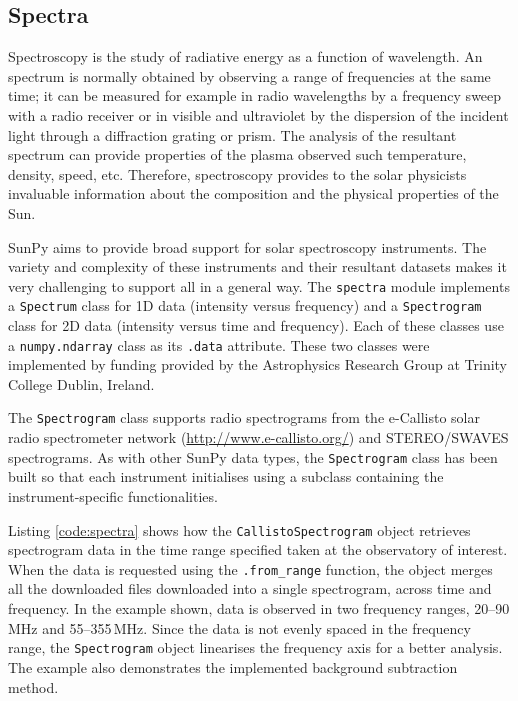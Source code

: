 \subsection{Spectra}\label{sec:spectra}

Spectroscopy is the study of radiative energy as a function of wavelength.
An spectrum is normally obtained by observing a range of frequencies at the same time; 
it can be measured for example in radio wavelengths by a frequency sweep with 
a radio receiver or in visible and ultraviolet by the dispersion of the incident light 
through a diffraction grating or prism.
The analysis of the resultant spectrum can provide properties of the plasma observed 
such temperature, density, speed, etc.
Therefore, spectroscopy provides to the solar physicists invaluable information about 
the composition and the physical properties of the Sun.  

SunPy aims to provide broad support for solar spectroscopy
instruments.  The variety and complexity of these instruments and
their resultant datasets makes it very challenging to support all in a
general way.  The \texttt{spectra} module implements a
\texttt{Spectrum} class for 1D data (intensity versus frequency) and a
\texttt{Spectrogram} class for 2D data (intensity versus time and
frequency).  Each of these classes use a \texttt{numpy.ndarray} class
as its \texttt{.data} attribute.  These two classes were implemented
by funding provided by the Astrophysics Research Group at Trinity
College Dublin, Ireland.

The \texttt{Spectrogram} class supports radio spectrograms from the e-Callisto 
solar radio spectrometer network (\url{http://www.e-callisto.org/})
and STEREO/SWAVES spectrograms.
As with other SunPy data types, the \texttt{Spectrogram} class has been
built so that each instrument initialises using a subclass containing the instrument-specific 
functionalities.

Listing \ref{code:spectra} shows how the \texttt{CallistoSpectrogram}
object retrieves spectrogram data in the time range specified taken at
the observatory of interest.  When the data is requested using the
\texttt{.from\_range} function, the object merges all the downloaded
files downloaded into a single spectrogram, across time and frequency.
In the example shown, data is observed in two frequency ranges, 
20--90\,MHz and 55--355\,MHz.  Since the data is not evenly spaced in
the frequency range, the \texttt{Spectrogram} object linearises the
frequency axis for a better analysis.  The example also demonstrates
the implemented background subtraction method.

